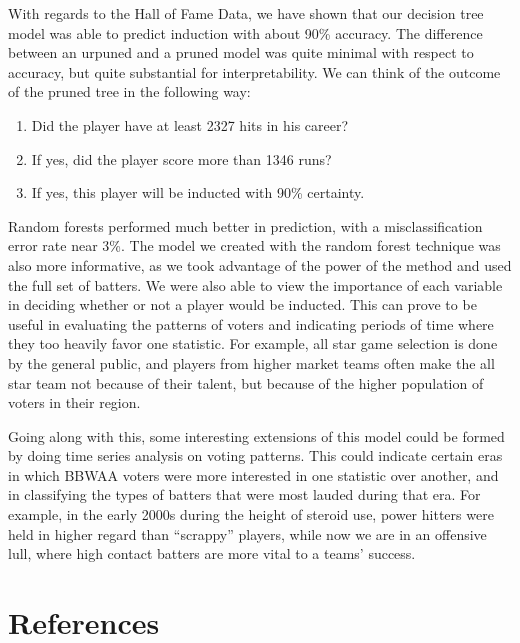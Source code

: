 \documentclass[preprint,12pt]{elsarticle}
\begin{document}
With regards to the Hall of Fame Data, we have shown that our decision tree model was able to predict induction with about 90\% accuracy. The difference between an urpuned and a pruned model was quite minimal with respect to accuracy, but quite substantial for interpretability. We can think of the outcome of the pruned tree in the following way:


\begin{enumerate}
	\item Did the player have at least 2327 hits in his career?
	\item If yes, did the player score more than 1346 runs?
	\item If yes, this player will be inducted with 90\% certainty. 
\end{enumerate}

Random forests performed much better in prediction, with a misclassification error rate near 3\%. The model we created with the random forest technique was also more informative, as we took advantage of the power of the method and used the full set of batters. We were also able to view the importance of each variable in deciding whether or not a player would be inducted. This can prove to be useful in evaluating the patterns of voters and indicating periods of time where they too heavily favor one statistic. For example, all star game selection is done by the general public, and players from higher market teams often make the all star team not because of their talent, but because of the higher population of voters in their region.

Going along with this, some interesting extensions of this model could be formed by doing time series analysis on voting patterns. This could indicate certain eras in which BBWAA voters were more interested in one statistic over another, and in classifying the types of batters that were most lauded during that era. For example, in the early 2000s during the height of steroid use, power hitters were held in higher regard than ``scrappy'' players, while now we are in an offensive lull, where high contact batters are more vital to a teams' success.


\section{References}


\end{document}
